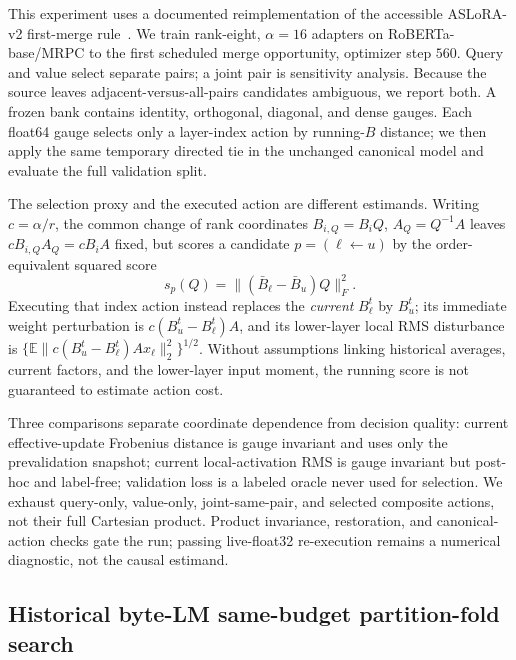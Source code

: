 This experiment uses a documented reimplementation of the
accessible ASLoRA-v2 first-merge rule~\citep{hu2024aslorav2}.  We train
rank-eight, $\alpha=16$ adapters on
RoBERTa-base/MRPC to the first scheduled merge opportunity, optimizer step
$560$.  Query and value select separate pairs; a joint pair is sensitivity
analysis.  Because the source leaves adjacent-versus-all-pairs candidates
ambiguous, we report both.  A frozen bank contains identity, orthogonal,
diagonal, and dense gauges.  Each float64 gauge selects only a layer-index
action by running-$B$ distance; we then apply the same temporary directed tie
in the unchanged canonical model and evaluate the full validation split.

The selection proxy and the executed action are different estimands.  Writing
$c=\alpha/r$, the common change of rank coordinates
$B_{i,Q}=B_iQ$, $A_Q=Q^{-1}A$ leaves
$cB_{i,Q}A_Q=cB_iA$ fixed, but scores a candidate
$p=(\ell\leftarrow u)$ by the order-equivalent squared score
\begin{equation}
 s_p(Q)=\|({\bar B}_\ell-{\bar B}_u)Q\|_F^2.
 \label{eq:aslora_selection_score}
\end{equation}
Executing that index action instead replaces the \emph{current} $B_\ell^t$
by $B_u^t$; its immediate weight perturbation is
$c(B_u^t-B_\ell^t)A$, and its lower-layer local RMS disturbance is
$\{\mathbb E\|c(B_u^t-B_\ell^t)Ax_\ell\|_2^2\}^{1/2}$.  Without assumptions
linking historical averages, current factors, and the lower-layer input
moment, the running score is not guaranteed to estimate action cost.

Three comparisons separate coordinate dependence from decision quality:
current effective-update Frobenius distance is gauge invariant and uses only
the prevalidation snapshot; current local-activation RMS is gauge invariant
but post-hoc and label-free; validation loss is a labeled oracle never used for
selection.  We exhaust query-only, value-only, joint-same-pair, and selected
composite actions, not their full Cartesian product.  Product invariance,
restoration, and canonical-action checks gate the run; passing live-float32
re-execution remains a numerical diagnostic, not the causal estimand.

\subsection{Historical byte-LM same-budget partition-fold search}

